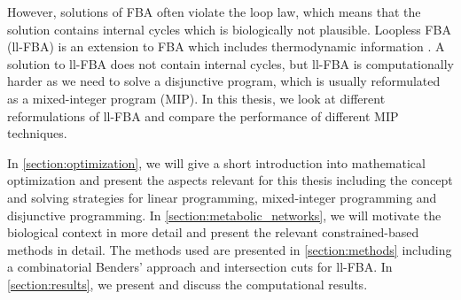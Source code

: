 However, solutions of FBA often violate the loop law, which means that the solution contains internal cycles which is biologically not plausible. Loopless FBA (ll-FBA) is an extension to FBA which includes thermodynamic information \cite{elimination_infeasible_loops}. A solution to ll-FBA does not contain internal cycles, but ll-FBA is computationally harder as we need to solve a disjunctive program, which is usually reformulated as a mixed-integer program (MIP). 
In this thesis, we look at different reformulations of ll-FBA and compare the performance of different MIP techniques. 



In \cref{section:optimization}, we will give a short introduction into mathematical optimization and present the aspects relevant for this thesis including the concept and solving strategies for linear programming, mixed-integer programming and disjunctive programming. In \cref{section:metabolic_networks}, we will motivate the biological context in more detail and present the relevant constrained-based methods in detail. 
The methods used are presented in \cref{section:methods} including a combinatorial Benders' approach and intersection cuts for ll-FBA. In \cref{section:results}, we present and discuss the computational results. 



